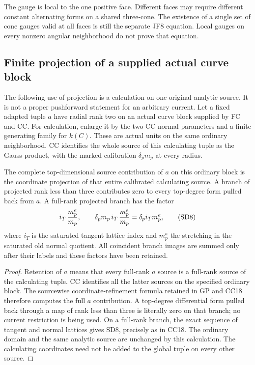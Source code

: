 The gauge is local to the one positive face.  Different faces
may require different constant alternating forms on a shared
three-cone.  The existence of a single set of cone gauges valid
at all faces is still the separate JF8 equation.  Local gauges
on every nonzero angular neighborhood do not prove that equation.

\subsection{Finite projection of a supplied actual curve block}

The following use of projection is a calculation on one original
analytic source.  It is not a proper pushforward statement for
an arbitrary current.  Let a fixed adapted tuple $a$ have
radial rank two on an actual curve block supplied by FC and CC.
For calculation, enlarge it by the two CC normal parameters and
a finite generating family for $k(C)$.  These are actual units
on the same ordinary neighborhood.  CC identifies the whole
source of this calculating tuple as the Gauss product, with
the marked calibration $\delta_pm_p$ at every radius.

\begin{lemma}
\label{lem:r13-sd-finite-calculating-projection}
The complete top-dimensional source contribution of $a$ on this
ordinary block is the coordinate projection of that entire
calibrated calculating source.  A branch of projected rank less
than three contributes zero to every top-degree form pulled
back from $a$.  A full-rank projected branch has the factor
\[
             i_T\,{m_p^{a}\over m_p},
             \qquad
        \delta_pm_p\,i_T\,{m_p^{a}\over m_p}
                    =\delta_pi_Tm_p^{a},
 \tag{SD8}
\]
where $i_T$ is the saturated tangent lattice index and
$m_p^{a}$ the stretching in the saturated old normal quotient.
All coincident branch images are summed only after their labels
and these factors have been retained.
\end{lemma}

\begin{proof}
Retention of $a$ means that every full-rank $a$ source is a
full-rank source of the calculating tuple.  CC identifies all
the latter sources on the specified ordinary block.  The
sourcewise coordinate-refinement formula retained in GP and
CC18 therefore computes the full $a$ contribution.  A
top-degree differential form pulled back through a map of rank
less than three is literally zero on that branch; no current
restriction is being used.  On a full-rank branch, the exact
sequence of tangent and normal lattices gives SD8, precisely as
in CC18.  The ordinary domain and the same analytic source are
unchanged by this calculation.  The calculating coordinates
need not be added to the global tuple on every other source.
\end{proof}

